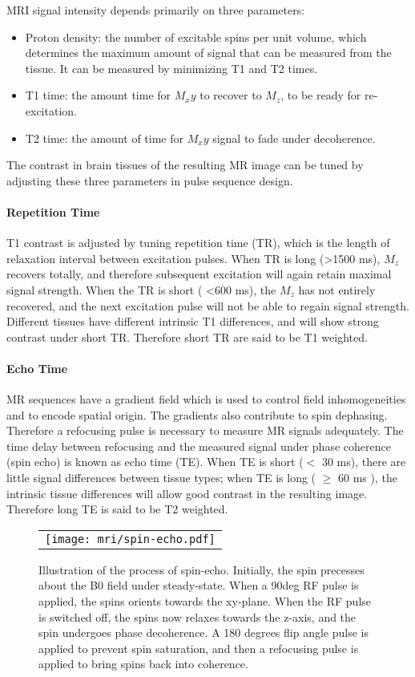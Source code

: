 MRI signal intensity depends primarily on three parameters: 
\begin{itemize}
\item Proton density: the number of excitable spins per unit volume, which determines the maximum amount of signal that can be measured from the tissue. It can be measured by minimizing T1 and T2 times. 
\item T1 time: the amount time for $M_xy$ to recover to $M_z$, to be ready for re-excitation.
\item T2 time: the amount of time for $M_xy$ signal to fade under decoherence. 
\end{itemize}
The contrast in brain tissues of the resulting MR image can be tuned by adjusting these three parameters in pulse sequence design.

\paragraph{Repetition Time}
T1 contrast is adjusted by tuning repetition time (TR), which is the length of relaxation interval between excitation pulses. When TR is long (\textgreater 1500 ms), $M_z$ recovers totally, and therefore subsequent excitation will again retain maximal signal strength. When the TR is short (
\textless 600 ms), the $M_z$ has not entirely recovered, and the next excitation pulse will not be able to regain signal strength. Different tissues have different intrinsic T1 differences, and will show strong contrast under short TR. Therefore short TR are said to be T1 weighted. 

\paragraph{Echo Time}
MR sequences have a gradient field which is used to control field inhomogeneities and to encode spatial origin. The gradients also contribute to spin dephasing. Therefore a refocusing pulse is necessary to measure MR signals adequately. The time delay between refocusing and the measured signal under phase coherence (spin echo) is known as echo time (TE). When TE is short ($<$ 30 ms), there are little signal differences between tissue types; when TE is long ( $\geq$ 60 ms ), the intrinsic tissue differences will allow good contrast in the resulting image. Therefore long TE is said to be T2 weighted.

\begin{figure}[htb]
\begin{center}
\begin{tabular}{c}
\texttt{[image: mri/spin-echo.pdf]}
\end{tabular}
\caption{Illustration of the process of spin-echo. Initially, the spin precesses about the B0 field under steady-state. When a 90deg RF pulse is applied, the spins orients towards the xy-plane. When the RF pulse is switched off, the spins now relaxes towards the z-axis, and the spin undergoes phase decoherence. A 180 degrees flip angle pulse is applied to prevent spin saturation, and then a refocusing pulse is applied to bring spins back into coherence.  } \label{fig:spin-echo}
\end{center}
\end{figure}


